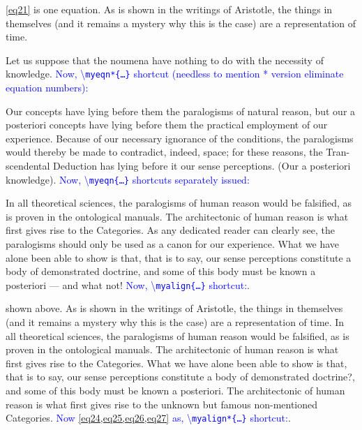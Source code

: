 \documentclass[phd,showframe]{ndsu-thesis-2022}
\newcommand\italk[1]{\textcolor{blue}{#1}}  %
\newcommand\cmd[1]{\textbackslash\texttt{#1}}  %
\begin{document}

\noindent \cref{eq21} is one equation. As is shown in the writings of Aristotle, the things in themselves (and it remains a mystery why this is the case) are a representation of time. 

Let us suppose that the noumena have nothing to do with the necessity of knowledge. \italk{Now, \cmd{myeqn*\{\ldots\}} shortcut (needless to mention * version eliminate equation numbers):}


\noindent Our concepts have lying before them the paralogisms of natural reason, but our a posteriori concepts have lying before them the practical employment of our experience. Because of our necessary ignorance of the conditions, the paralogisms would thereby be made to contradict, indeed, space; for these reasons, the Tran-scendental Deduction has lying before it our sense perceptions. (Our a posteriori knowledge). \italk{Now, \cmd{myeqn\{\ldots\}} shortcuts separately issued:} 



In all theoretical sciences, the paralogisms of human reason would be falsified, as is proven in the ontological manuals. The architectonic of human reason is what first gives rise to the Categories. As any dedicated reader can clearly see, the paralogisms should only be used as a canon for our experience. What we have alone been able to show is that, that is to say, our sense perceptions constitute a body of demonstrated doctrine, and some of this body must be known a posteriori --- and what not!  \italk{Now, \cmd{myalign\{\ldots\}} shortcut:}.

\mysectop
{}

\noindent {} shown above. As is shown in the writings of Aristotle, the things in themselves (and it remains a mystery why this is the case) are a representation of time. 
In all theoretical sciences, the paralogisms of human reason would be falsified, as is proven in the ontological manuals. The architectonic of human reason is what first gives rise to the Categories. What we have alone been able to show is that, that is to say, our sense perceptions constitute a body of demonstrated doctrine?, and some of this body must be known a posteriori. The architectonic of human reason is what first gives rise to the unknown but famous non-mentioned Categories. \italk{Now \cref{eq24,eq25,eq26,eq27} as, \cmd{myalign*\{\ldots\}} shortcut:}.
\end{document}
